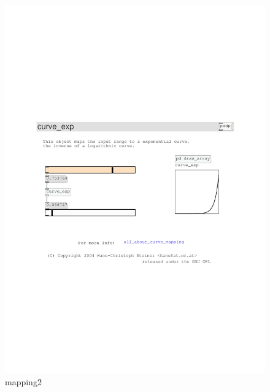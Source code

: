 \documentclass{ppgmus}
\begin{document}
\begin{figure}
\includegraphics[scale=.4]{mapping2}
\caption{mapping2}
\label{mapping2}
\end{figure}
\end{document}
